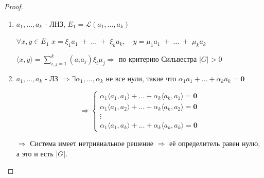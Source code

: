 \vspace{0.2cm}
\begin{proof}
\leavevmode \newline
    \begin{enumerate}
        \item ${a_{1}, \ldots, a_{k}}$ - ЛНЗ, \quad $E_{1} = \mathcal{L}(a_{1}, \ldots, a_{k})$ 
        \newline 
        
        $\forall x, y \in E_{1}$ \quad  $x = \xi_{1} a_{1} \; + \; \ldots \; + \; \xi_{k} a_{k}, \quad y = \mu_{1} a_{1} \; + \; \ldots \; + \; \mu_{k} a_{k}$ 
        \newline 
        
        $\langle x, y \rangle = \sum\limits_{i, j = 1}^{k} (a_{i} a_{j}) \xi_{i} \mu_{j} \Longrightarrow$ по критерию Сильвестра $|G| > 0$
        \newline 
        
        \item ${a_{1}, \ldots, a_{k}}$ - ЛЗ \; $\Longrightarrow \exists \alpha_{1}, \ldots, \alpha_{k}$ не все нули, такие что $\alpha_{1} a_{1} + \ldots + \alpha_{k} a_{k} = \boldsymbol{0}$
        \newline
        
        
    \[
    \Longrightarrow
        \begin{cases}
            \alpha_{1} \langle a_1, a_{1} \rangle + \ldots + \alpha_{k} \langle a_{k}, a_{1} \rangle = \mathbf{0} \\
            \alpha_{1} \langle a_{1}, a_{2} \rangle + \ldots + \alpha_{k} \langle a_{k}, a_{2} \rangle = \mathbf{0} \\
            \vdots \\
            
            \alpha_{1} \langle a_{1}, a_{k} \rangle + \ldots + \alpha_{k} \langle a_{k}, a_{k} \rangle = \mathbf{0}
        \end{cases}
    \]
    \newline
    
    $\Longrightarrow$ Система имеет нетривиальное решение $\Longrightarrow$ её определитель равен нулю, а это и есть $|G|.$
    \end{enumerate}
\end{proof}
